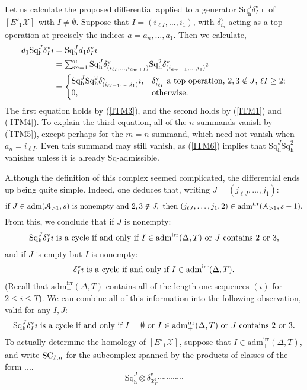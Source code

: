 \documentclass[11pt]{amsart} \renewcommand{\baselinestretch}{1.4}
\theoremstyle{plain}
\theoremstyle{definition}
\newcommand{\calA}{\mathcal{A}}
\newcommand{\calx}{\mathcal{X}}
\newcommand{\Sq}{\mathrm{Sq}}
\newcommand{\LieSteen}{\calA}
\newcommand{\aS}[1]{\mathrm{adm}(\LieSteen_{>1},#1)}
\newcommand{\aSirr}[1]{\mathrm{adm}^\mathrm{irr}(\LieSteen_{>1},#1)}
\newcommand{\aDTirr}{\mathrm{adm}_+^\mathrm{irr}(\Delta,T)}
\newcommand{\TOP}{\mathfrak{T}}
\newcommand{\Eprime}[5]{[E'_{#2}#3]^{#4}_{#5}}
\newcommand{\uver}{^\mathrm{v}}
\newcommand{\dhor}{_\mathrm{h}}
\newcommand{\Sqh}{\mathrm{Sq}\dhor}
\newcommand{\deltav}{\delta\uver}
\begin{document}
\begin{Calculations of HWn for n nonzero}
Let us calculate the proposed differential applied to a generator
$\Sq\dhor^J\deltav_I\imath$ of $\Eprime{blank}{1}{\calx}{}{}$ with $I\neq\emptyset$. Suppose that $I=(i_{\ell I},\ldots,i_1)$, with $\deltav_{i_a}$ acting as a top operation at precisely the indices $a={a_n},\ldots,{a_1}$. Then we calculate, 
\begin{alignat*}{2}
d_1\Sq\dhor^J\deltav_I\imath
&=
\Sq\dhor^Jd_1\deltav_I\imath%
\\
&=
\textstyle\sum_{m=1}^{n}\Sq\dhor^J\deltav_{(i_{\ell I},\ldots,i_{a_{m}+1})} \Sqh^{2} \deltav_{(i_{a_{m}-1},\ldots,i_1)}\imath%
\\
&=
\begin{cases}
\smash{\Sqh^J\Sqh^2\deltav_{(i_{{\ell I}-1},\ldots,i_1)}\imath},&\textup{$\deltav_{i_{\ell I}}$ a top operation, $2,3\notin J$, $\ell I\geq2$};\\
0,&\textup{otherwise}.
\end{cases}
\end{alignat*}
The first equation holds by (\ref{ITM3}), and the second holds by (\ref{ITM1}) and (\ref{ITM4}).
To explain the third equation, %
all of the $n$ summands vanish by (\ref{ITM5}), 
except perhaps for the $m=n$ summand, which need not vanish when $a_n=i_{\ell I}$. Even this summand may still vanish, as (\ref{ITM6}) implies that $\Sqh^J\Sqh^2$ vanishes unless it is already $\Sq$-admissible. 

Although the definition of this complex seemed complicated, the differential ends up being quite simple. Indeed, one deduces that, writing $J=(j_{\ell J},\ldots,j_1)$:
\[
\textup{if }J\in\aS{s}\textup{ is nonempty and } 2,3\notin J,\textup{ then }(j_{\ell J},\ldots,j_1,2)\in\aSirr{s-1}.
\]
From this, we conclude that if $J$ is nonempty:
\begin{equation}
\label{cycle conditions 1}
\textup{$\Sq\dhor^J\deltav_I\imath$ is a cycle if and only if $I \in \aDTirr$ or $J$ contains 2 or 3},
\end{equation}
and if $J$ is empty but $I$ is nonempty:
\begin{equation}
\label{cycle conditions 2}
\textup{$\deltav_I\imath$ is a cycle if and only if $I \in \aDTirr$}.\end{equation}
(Recall that $\aDTirr$ contains all of the length one sequences $(i)$ for $2\leq i \leq T$). We can combine all of this information into the following observation, valid for any $I,J$:
\begin{equation}
\label{cycle conditions 2}
\textup{$\Sq\dhor^J\deltav_I\imath$ is a cycle if and only if $I=\emptyset$ or $I \in \aDTirr$ or $J$ contains 2 or 3}.
\end{equation}
To actually determine the homology of $\Eprime{blank}{1}{\calx}{}{}$, suppose that $I \in \aDTirr$, and write $\textup{SC}_{I,n}$ for the subcomplex spanned by the products of classes of the form ....
\[\Sqh^J\otimes \deltav_{\TOP_T^k}\cdots \cdots \cdots \cdots \]

\end{Calculations of HWn for n nonzero}
\end{document}
